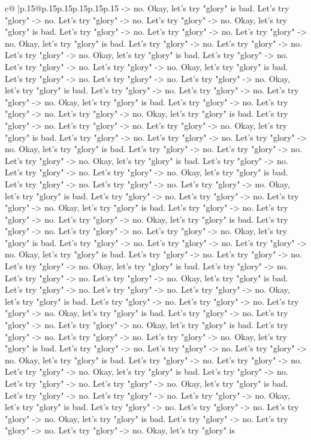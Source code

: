 \documentclass{article}
\begin{document}
{\begin{supertabular}{c@{$\;$}|p{.15\linewidth}@{}p{.15\linewidth}p{.15\linewidth}p{.15\linewidth}p{.15\linewidth}p{.15\linewidth}}
{{{{-}> no. Okay, let's try "glory" is bad. Let's try "glory" {-}> no. Let's try "glory" {-}> no. Let's try "glory" {-}> no. Okay, let's try "glory" is bad. Let's try "glory" {-}> no. Let's try "glory" {-}> no. Let's try "glory" {-}> no. Okay, let's try "glory" is bad. Let's try "glory" {-}> no. Let's try "glory" {-}> no. Let's try "glory" {-}> no. Okay, let's try "glory" is bad. Let's try "glory" {-}> no. Let's try "glory" {-}> no. Let's try "glory" {-}> no. Okay, let's try "glory" is bad. Let's try "glory" {-}> no. Let's try "glory" {-}> no. Let's try "glory" {-}> no. Okay, let's try "glory" is bad. Let's try "glory" {-}> no. Let's try "glory" {-}> no. Let's try "glory" {-}> no. Okay, let's try "glory" is bad. Let's try "glory" {-}> no. Let's try "glory" {-}> no. Let's try "glory" {-}> no. Okay, let's try "glory" is bad. Let's try "glory" {-}> no. Let's try "glory" {-}> no. Let's try "glory" {-}> no. Okay, let's try "glory" is bad. Let's try "glory" {-}> no. Let's try "glory" {-}> no. Let's try "glory" {-}> no. Okay, let's try "glory" is bad. Let's try "glory" {-}> no. Let's try "glory" {-}> no. Let's try "glory" {-}> no. Okay, let's try "glory" is bad. Let's try "glory" {-}> no. Let's try "glory" {-}> no. Let's try "glory" {-}> no. Okay, let's try "glory" is bad. Let's try "glory" {-}> no. Let's try "glory" {-}> no. Let's try "glory" {-}> no. Okay, let's try "glory" is bad. Let's try "glory" {-}> no. Let's try "glory" {-}> no. Let's try "glory" {-}> no. Okay, let's try "glory" is bad. Let's try "glory" {-}> no. Let's try "glory" {-}> no. Let's try "glory" {-}> no. Okay, let's try "glory" is bad. Let's try "glory" {-}> no. Let's try "glory" {-}> no. Let's try "glory" {-}> no. Okay, let's try "glory" is bad. Let's try "glory" {-}> no. Let's try "glory" {-}> no. Let's try "glory" {-}> no. Okay, let's try "glory" is bad. Let's try "glory" {-}> no. Let's try "glory" {-}> no. Let's try "glory" {-}> no. Okay, let's try "glory" is bad. Let's try "glory" {-}> no. Let's try "glory" {-}> no. Let's try "glory" {-}> no. Okay, let's try "glory" is bad. Let's try "glory" {-}> no. Let's try "glory" {-}> no. Let's try "glory" {-}> no. Okay, let's try "glory" is bad. Let's try "glory" {-}> no. Let's try "glory" {-}> no. Let's try "glory" {-}> no. Okay, let's try "glory" is bad. Let's try "glory" {-}> no. Let's try "glory" {-}> no. Let's try "glory" {-}> no. Okay, let's try "glory" is bad. Let's try "glory" {-}> no. Let's try "glory" {-}> no. Let's try "glory" {-}> no. Okay, let's try "glory" is bad. Let's try "glory" {-}> no. Let's try "glory" {-}> no. Let's try "glory" {-}> no. Okay, let's try "glory" is bad. Let's try "glory" {-}> no. Let's try "glory" {-}> no. Let's try "glory" {-}> no. Okay, let's try "glory" is bad. Let's try "glory" {-}> no. Let's try "glory" {-}> no. Let's try "glory" {-}> no. Okay, let's try "glory" is bad. Let's try "glory" {-}> no. Let's try "glory" {-}> no. Let's try "glory" {-}> no. Okay, let's try "glory" is bad. Let's try "glory" {-}> no. Let's try "glory" {-}> no. Let's try "glory" {-}> no. Okay, let's try "glory" is bad. Let's try "glory" {-}> no. Let's try "glory" {-}> no. Let's try "glory" {-}> no. Okay, let's try "glory" is }}}
\end{supertabular}}
\end{document}
